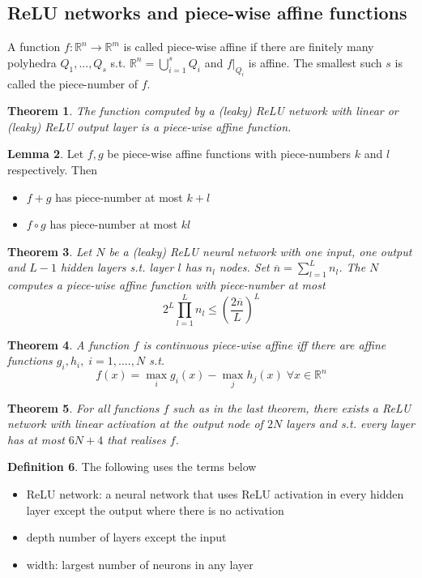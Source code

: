 \documentclass[a4paper, 12pt]{article}
\theoremstyle{plain}
\newtheorem{theorem}{Theorem}[subsection] %
\theoremstyle{definition}
\newtheorem{definition}[theorem]{Definition} %
\theoremstyle{lemma}
\newtheorem{lemma}[theorem]{Lemma}
\theoremstyle{remark}
\theoremstyle{example}
\begin{document}
	\subsection{ReLU networks and piece-wise affine functions}
	A function $f: \mathbb{R}^n \to \mathbb{R}^m$ is called piece-wise affine if there are finitely many polyhedra $Q_1,...,Q_s$ s.t. $\mathbb{R}^n = \bigcup_{i=1}^s Q_i$ and $f|_{Q_i}$ is affine. The smallest such $s$ is called the piece-number of $f$.
	\begin{theorem}
		The function computed by a (leaky) ReLU network with linear or (leaky) ReLU output layer is a piece-wise affine function.
	\end{theorem}
	\begin{lemma}
		Let $f,g$ be piece-wise affine functions with piece-numbers $k$ and $l$ respectively. Then \begin{itemize}
			\item $f+g$ has piece-number at most $k+l$
			\item $f\circ g$ has piece-number at most $kl$
		\end{itemize}
	\end{lemma}
	\begin{theorem}
		Let $N$ be a (leaky) ReLU neural network with one input, one output and $L-1$ hidden layers s.t. layer $l$ has $n_l$ nodes. Set $\overline{n} = \sum_{l=1}^{L} n_l$. The $N$ computes a piece-wise affine function with piece-number at most \[2^L \prod_{l=1}^{L}n_l \leq \left(\frac{2\overline{n}}{L}\right)^L\]
	\end{theorem}
	\begin{theorem}
		A function $f$ is continuous piece-wise affine iff there are affine functions $g_i, h_i ,\; i=1,....,N$ s.t. \[f(x) = \max_i g_i(x) - \max_j h_j(x) \; \forall x \in \mathbb{R}^n\]
	\end{theorem}
	\begin{theorem}
		For all functions $f$ such as in the last theorem, there exists a ReLU network with linear activation at the output node of $2N$ layers and s.t. every layer has at most $6N + 4$ that realises $f$. 
	\end{theorem}
	\begin{definition}
		The following uses the terms below
		\begin{itemize}
			\item ReLU network: a neural network that uses ReLU activation in every hidden layer except the output where there is no activation
			\item depth number of layers except the input
			\item width: largest number of neurons in any layer
		\end{itemize}
	\end{definition}
\end{document}
